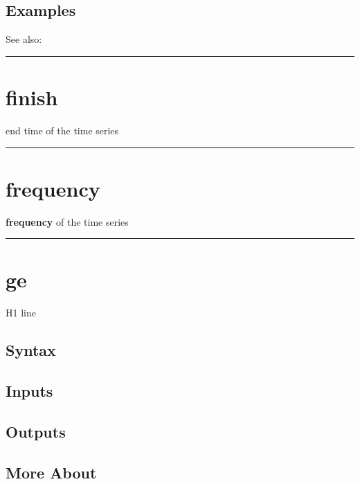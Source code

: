\documentclass[letterpaper,10pt,english]{sphinxmanual}
\begin{document}
\subsection{Examples}
\label{classes/time_series/@ts/ts:id232}
See also:


\bigskip\hrule{}\bigskip



\section{finish}
\label{classes/time_series/@ts/ts:finish}\label{classes/time_series/@ts/ts:id233}
end time of the time series


\bigskip\hrule{}\bigskip



\section{frequency}
\label{classes/time_series/@ts/ts:id234}\label{classes/time_series/@ts/ts:frequency}
\textbf{frequency} of the time series


\bigskip\hrule{}\bigskip



\section{ge}
\label{classes/time_series/@ts/ts:ge}\label{classes/time_series/@ts/ts:id235}
H1 line


\subsection{Syntax}
\label{classes/time_series/@ts/ts:id236}

\subsection{Inputs}
\label{classes/time_series/@ts/ts:id237}

\subsection{Outputs}
\label{classes/time_series/@ts/ts:id238}

\subsection{More About}
\label{classes/time_series/@ts/ts:id239}
\end{document}
